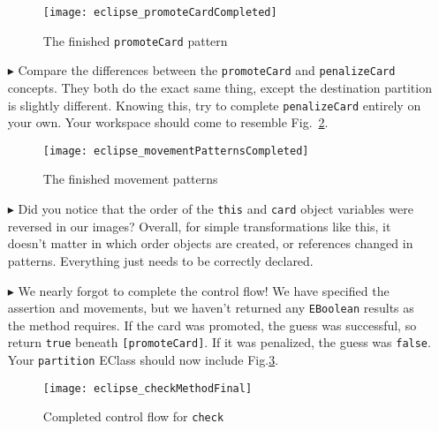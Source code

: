 \begin{itemize}
\begin{figure}[htbp]
\begin{center}
  \texttt{[image: eclipse\_promoteCardCompleted]}
  \caption{The finished \texttt{promoteCard} pattern}
  \label{fig:completedPromote}
\end{center}
\end{figure} 

\item[$\blacktriangleright$] Compare the differences between the \texttt{promoteCard} and \texttt{penalizeCard} concepts. They both do the exact same thing,
except the destination partition is slightly different. Knowing this, try to complete \texttt{penalizeCard} entirely on your own. Your workspace should come to
resemble Fig.~\ref{fig:completedPatterns}.

\begin{figure}[htbp]
\begin{center}
  \texttt{[image: eclipse\_movementPatternsCompleted]}
  \caption{The finished movement patterns}
  \label{fig:completedPatterns}
\end{center}
\end{figure}


\item[$\blacktriangleright$] Did you notice that the order of the \texttt{this} and \texttt{card} object variables were reversed in our images?
Overall, for simple transformations like this, it doesn't matter in which order objects are created, or references changed in patterns. Everything just needs to
be correctly declared.

\item[$\blacktriangleright$] We nearly forgot to complete the control flow! We have specified the assertion and movements, but we haven't returned any
\texttt{EBoolean} results as the method requires. If the card was promoted, the guess was successful, so return \texttt{true} beneath \texttt{[promoteCard]}. If
it was penalized, the guess was \texttt{false}. Your \texttt{partition} EClass should now include Fig.\ref{fig:finalMethod}.

\vspace{0.5cm}

\begin{figure}[htbp]
\begin{center}
  \texttt{[image: eclipse\_checkMethodFinal]}
  \caption{Completed control flow for \texttt{check}}
  \label{fig:finalMethod}
\end{center}
\end{figure}


\end{itemize}

